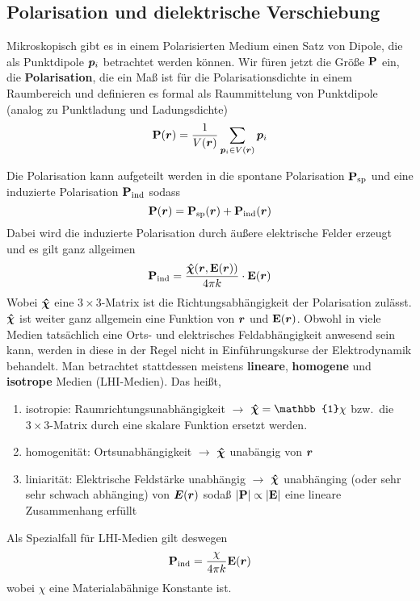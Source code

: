 \subsection{Polarisation und dielektrische Verschiebung}%
\label{sub:Polarisation}
Mikroskopisch gibt es in einem Polarisierten Medium einen Satz von Dipole,
die als Punktdipole $\vb*p_i$ betrachtet werden können. Wir füren jetzt die
Größe $\vb P$ ein, die \textbf{Polarisation}, die ein Maß ist für die 
Polarisationsdichte in einem Raumbereich und definieren es formal als 
Raummittelung von Punktdipole (analog zu Punktladung und Ladungsdichte) 
\begin{equation}
  \vb P(\vb*r) = \frac{1}{V(\vb*r)}\sum_{\vb*p_i\in V(\vb*r)} \vb*p_i
\end{equation}

Die Polarisation kann aufgeteilt werden in die spontane Polarisation 
$\vb P_\text{sp}$ und eine induzierte Polarisation $\vb P_\text{ind}$ sodass
\begin{equation}
  \vb P(\vb*r) = \vb P_\text{sp}(\vb*r) + \vb P_\text{ind}(\vb*r)
\end{equation}
Dabei wird die induzierte Polarisation durch äußere elektrische Felder erzeugt
und es gilt ganz allgeimen
\begin{equation}
  \vb P_\text{ind} = \frac{\vu*\chi\qty(\vb*r, \vb E(\vb*r))}{4\pi k} \cdot \vb E(\vb*r)
\end{equation}
Wobei $\vu*\chi$ eine $3\times3$-Matrix ist die Richtungsabhängigkeit der
Polarisation zulässt. $\vu*\chi$ ist weiter ganz allgemein eine Funktion
von $\vb*r$ und $\vb E(\vb*r)$. Obwohl in viele Medien tatsächlich eine Orts-
und elektrisches Feldabhängigkeit anwesend sein kann, werden in diese in
der Regel nicht in Einführungskurse der Elektrodynamik behandelt. Man 
betrachtet stattdessen meistens \textbf{lineare}, \textbf{homogene} und 
\textbf{isotrope} Medien (LHI-Medien). Das heißt,
\begin{enumerate}
  \item isotropie: Raumrichtungsunabhängigkeit $\rightarrow$ 
    $\vu*\chi=\mathbb{1}\chi$ bzw.\ die $3\times3$-Matrix 
    durch eine skalare Funktion ersetzt werden.
  \item homogenität: Ortsunabhängigkeit $\rightarrow$ 
    $\vu*\chi$ unabängig von $\vb*r$
  \item liniarität: Elektrische Feldstärke unabhängig $\rightarrow$
    $\vu*\chi$ unabhänging (oder sehr sehr schwach abhänging) 
    von $\vb*E(\vb*r)$ sodaß $\abs{\vb P} 
    \propto \abs{\vb E}$ eine lineare Zusammenhang erfüllt
\end{enumerate}
Als Spezialfall für LHI-Medien gilt deswegen
\begin{equation}
  \vb P_\text{ind} = \frac{\chi}{4\pi k} \vb E(\vb*r)
\end{equation}
wobei $\chi$ eine Materialabähnige Konstante ist.

